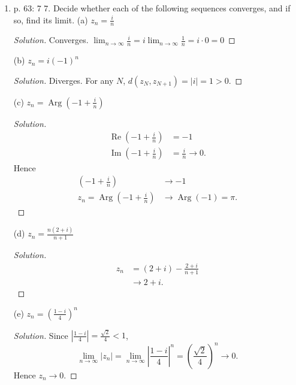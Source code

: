 \begin{enumerate}
(c) $h(z)=\frac{1}{z}$ for $0<|z| \leq 1$
\begin{proof}[Solution]
	$\{z \in \mathbb{C}: |z| \ge  1\} $
\end{proof}

(d) $p(z)=-2 z^3$ for $z$ in the quarter-disk $|z|<1,0<\operatorname{Arg} z<\frac{\pi}{2}$
\begin{proof}[Solution]
	The range of $q(z):= z^3$ of the region is  $\{z \in \mathbb{C}: |z| < 1, 0<\operatorname{Arg} z < \frac{3 \pi}{2}\} $. Hence range of $p$ is
	\[
		-2 \{z \in \mathbb{C}: |z| < 1, 0<\operatorname{Arg} z < \frac{3 \pi}{2}\} = \{z \in \mathbb{C}: |z|< 2, \operatorname{Arg} z \in [0,\frac{\pi}{2}) \cup  (\pi, 2 \pi)\} 
	.\] 
\end{proof}

\item p. 63: 7
	7. Decide whether each of the following sequences converges, and if so, find its limit.
(a) $z_n=\frac{i}{n}$
\begin{proof}[Solution]
	Converges. $\lim_{n \to \infty} \frac{i}{n} = i \lim_{n \to \infty} \frac{1}{n} = i \cdot 0 = 0$ 
\end{proof}

(b) $z_n=i(-1)^n$
\begin{proof}[Solution]
	Diverges. For any $N$, $d(z_N, z_{N+1}) = |i| = 1>0$.
\end{proof}

(c) $z_n=\operatorname{Arg}\left(-1+\frac{i}{n}\right)$
\begin{proof}[Solution]
	 \begin{align*}
		\operatorname{Re} (-1+\frac{i}{n}) &=  -1 \\
		\operatorname{Im} (-1+\frac{i}{n})&= \frac{i}{n} \to 0 
	.\end{align*}
	Hence 
	\begin{align*}
		(-1+\frac{i}{n}) &\to -1\\
		z_n = \operatorname{Arg}  
		(-1+\frac{i}{n}) &\to \operatorname{Arg} (-1) = \pi
	.\end{align*}
\end{proof}

(d) $z_n=\frac{n(2+i)}{n+1}$
\begin{proof}[Solution]
	\begin{align*}
		z_n &= (2+i) - \frac{2+i}{n+1}\\
		    &\to 2+i
	.\end{align*}
\end{proof}

(e) $z_n=\left(\frac{1-i}{4}\right)^n$
\begin{proof}[Solution]
	Since $\left| \frac{1-i}{4} \right| = \frac{\sqrt{2} }{4}  < 1$,
	\[
		\lim_{n \to \infty} |z_n| = \lim_{n \to \infty} \left| \frac{1-i}{4} \right|^n = \left( \frac{\sqrt{2}}{4}  \right) ^n \to 0
	.\] 
	Hence $z_n \to  0$.
\end{proof}


\end{enumerate}
